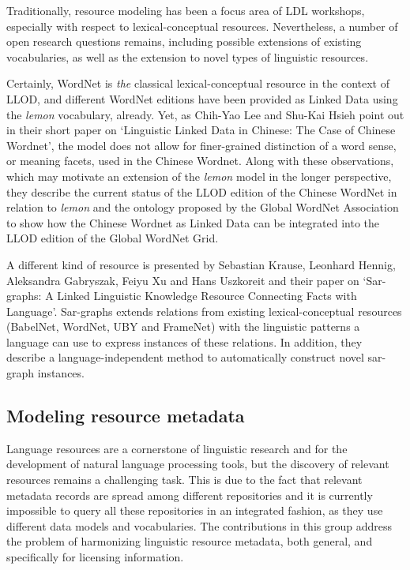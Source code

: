 Traditionally, resource modeling has been a focus area of LDL workshops, especially with respect to lexical-conceptual resources. 
Nevertheless, a number of open research questions remains, including possible extensions of existing vocabularies, as well as the extension to novel types of linguistic resources.

Certainly, WordNet is \emph{the} classical lexical-conceptual resource in the context of LLOD, and different WordNet editions have been provided as Linked Data using the \emph{lemon} vocabulary, already.
Yet, as Chih-Yao Lee and Shu-Kai Hsieh point out in their short paper on `Linguistic Linked Data in Chinese: The Case of Chinese Wordnet', the model does not allow for finer-grained distinction of a word sense, or meaning facets, used in the Chinese Wordnet. Along with these observations, which may motivate an extension of the \emph{lemon} model in the longer perspective, they describe the current status of the LLOD edition of the Chinese WordNet in relation to \emph{lemon} and the ontology proposed by the Global WordNet Association to show how the Chinese Wordnet as Linked Data can be integrated into the LLOD edition of the Global WordNet Grid.

A different kind of resource is presented by Sebastian Krause, Leonhard Hennig, Aleksandra Gabryszak, Feiyu Xu and Hans Uszkoreit and  their paper on `Sar-graphs: A Linked Linguistic Knowledge Resource Connecting Facts with Language'. Sar-graphs extends relations from existing lexical-conceptual resources (BabelNet, WordNet, UBY and FrameNet) with the linguistic patterns a language can use to express instances of these relations. In addition, they describe a language-independent method to automatically construct novel sar-graph instances. 

\subsection{Modeling resource metadata}

Language resources are a cornerstone of linguistic research and for the development of natural language processing tools, but the discovery of relevant resources remains a challenging task. 
This is due to the fact that relevant metadata records are spread among different repositories and it is currently impossible to query all these repositories in an integrated fashion, as they use different data models and vocabularies. The contributions in this group address the problem of harmonizing linguistic resource metadata, both general, and specifically for licensing information.

